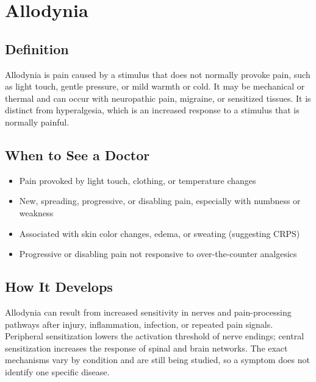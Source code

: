 \chapter{Allodynia}

\section*{Definition}
Allodynia is pain caused by a stimulus that does not normally provoke pain, such as light touch, gentle pressure, or mild warmth or cold. It may be mechanical or thermal and can occur with neuropathic pain, migraine, or sensitized tissues. It is distinct from hyperalgesia, which is an increased response to a stimulus that is normally painful.

\section*{When to See a Doctor}

\begin{itemize}
 \item Pain provoked by light touch, clothing, or temperature changes
 \item New, spreading, progressive, or disabling pain, especially with numbness or weakness
 \item Associated with skin color changes, edema, or sweating (suggesting CRPS)
 \item Progressive or disabling pain not responsive to over-the-counter analgesics
\end{itemize}

\section*{How It Develops}
Allodynia can result from increased sensitivity in nerves and pain-processing pathways after injury, inflammation, infection, or repeated pain signals. Peripheral sensitization lowers the activation threshold of nerve endings; central sensitization increases the response of spinal and brain networks. The exact mechanisms vary by condition and are still being studied, so a symptom does not identify one specific disease.

